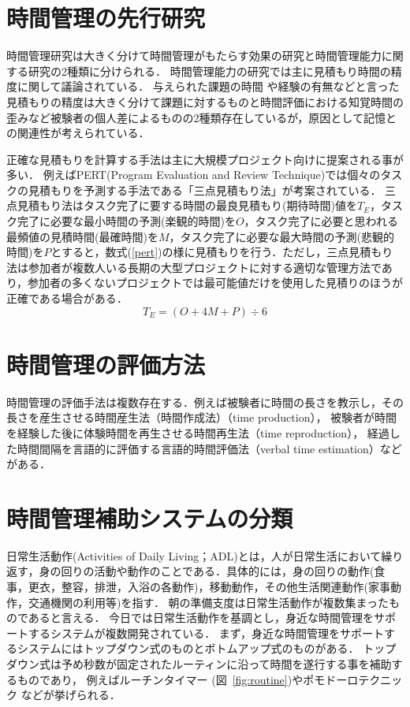 \section{時間管理の先行研究}
時間管理研究は大きく分けて時間管理がもたらす効果の研究と時間管理能力に関する研究の2種類に分けられる．
時間管理能力の研究では主に見積もり時間の精度に関して議論されている．
与えられた課題の時間 \cite{Roy2008}や経験の有無\cite{Roy2007}などと言った見積もりの精度は大きく分けて課題に対するものと時間評価における知覚時間の歪み\cite{Oguro1961}\cite{Murakami2016}など被験者の個人差によるものの2種類存在しているが，原因として記憶との関連性が考えられている\cite{Roy2005}．

正確な見積もりを計算する手法は主に大規模プロジェクト向けに提案される事が多い．
例えばPERT(Program Evaluation and Review Technique)では個々のタスクの見積もりを予測する手法である「三点見積もり法」が考案されている．
三点見積もり法はタスク完了に要する時間の最良見積もり(期待時間)値を$T_{E}$，タスク完了に必要な最小時間の予測(楽観的時間)を$O$，タスク完了に必要と思われる最頻値の見積時間(最確時間)を$M$，タスク完了に必要な最大時間の予測(悲観的時間)を$P$とすると，数式(\ref{pert})の様に見積もりを行う．ただし，三点見積もり法は参加者が複数人いる長期の大型プロジェクトに対する適切な管理方法であり，参加者の多くないプロジェクトでは最可能値だけを使用した見積りのほうが正確である場合がある\cite{Kato1965}．
\begin{equation}
\label{pert}
T_{E} = (O + 4M + P) ÷ 6
\end{equation}

\section{時間管理の評価方法}
時間管理の評価手法は複数存在する．例えば被験者に時間の長さを教示し，その長さを産生させる時間産生法（時間作成法）（time production），
被験者が時間を経験した後に体験時間を再生させる時間再生法（time reproduction），
経過した時間間隔を言語的に評価する言語的時間評価法（verbal time estimation）などがある\cite{Oguro1961}\cite{Tayama2018}．

\section{時間管理補助システムの分類}
日常生活動作(Activities of Daily Living；ADL)とは，人が日常生活において繰り返す，身の回りの活動や動作のことである．具体的には，身の回りの動作(食事，更衣，整容，排泄，入浴の各動作)，移動動作，その他生活関連動作(家事動作，交通機関の利用等)を指す\cite{Sakai2003}．
朝の準備支度は日常生活動作が複数集まったものであると言える．
今日では日常生活動作を基調とし，身近な時間管理をサポートするシステムが複数開発されている．
まず，身近な時間管理をサポートするシステムにはトップダウン式のものとボトムアップ式のものがある．
トップダウン式は予め秒数が固定されたルーティンに沿って時間を遂行する事を補助するものであり，
例えばルーチンタイマー\cite{RoutineTimer} (図~\ref{fig:routine})やポモドーロテクニック\cite{pomodoro} などが挙げられる．

